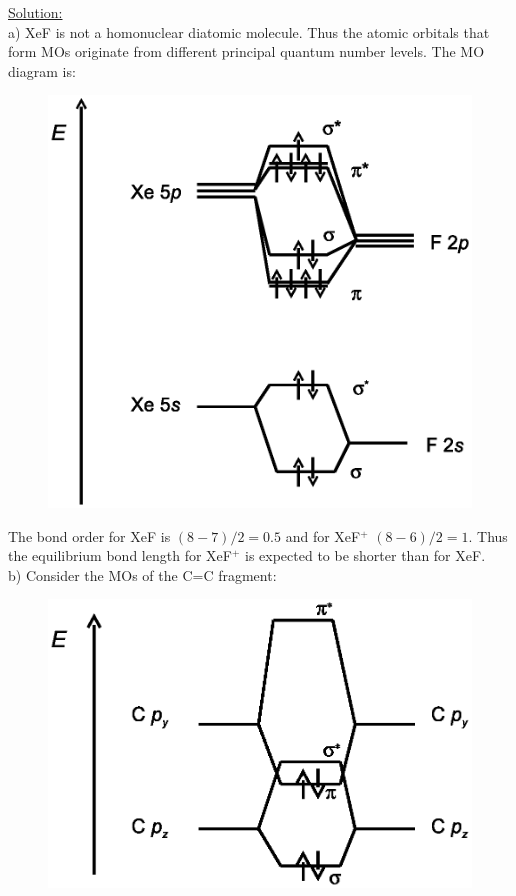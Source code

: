 \noindent
\underline{Solution:}\\

\noindent
a) XeF is not a homonuclear diatomic molecule. Thus the atomic orbitals 
that form MOs originate from different principal quantum number levels.
The MO diagram is:\\
\newpage
\noindent
\begin{figure}[h]
\centering
\includegraphics[scale=0.5]{xefmo}
\end{figure}

\noindent
The bond order for XeF is $(8 - 7) / 2 = 0.5$ and for XeF$^+$ $(8 - 6)
/ 2 = 1$. Thus the equilibrium bond length for XeF$^+$ is expected to be
shorter than for XeF.\\

\noindent
b) Consider the MOs of the C=C fragment:
\noindent
\begin{figure}[h]
\centering
\includegraphics[scale=0.5]{ccmo}
\end{figure}

